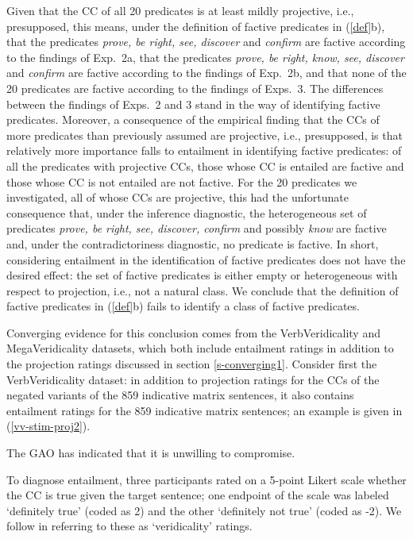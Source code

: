 \documentclass[11pt,fleqn]{article}
\newcommand{\6}{\mbox{$[\hspace*{-.6mm}[$}}
\newcommand{\9}{\mbox{$]\hspace*{-.6mm}]$}}
\begin{document}
{Given that the CC of all 20 predicates is at least mildly projective, i.e., presupposed, this means, under the definition of factive predicates in (\ref{def}b), that the predicates {\em prove, be right, see, discover} and {\em confirm} are factive according to the findings of Exp.~2a, that the predicates {\em prove, be right, know, see, discover} and {\em confirm} are factive according to the findings of Exp.~2b, and that none of the 20 predicates are factive according to the findings of Exps.~3. The differences between the findings of Exps.~2 and 3 stand in the way of identifying factive predicates. Moreover, a consequence of the empirical finding that the CCs of more predicates than previously assumed are projective, i.e., presupposed, is that relatively more importance falls to entailment in identifying factive predicates: of all the predicates with projective CCs, those whose CC is entailed are factive and those whose CC is not entailed are not factive. For the 20 predicates we investigated, all of whose CCs are projective, this had the unfortunate consequence that, under the inference diagnostic, the heterogeneous set of predicates {\em prove, be right, see, discover, confirm} and possibly {\em know} are factive and, under the contradictoriness diagnostic, no predicate is factive. In short, considering entailment in the identification of factive predicates does not have the desired effect: the set of factive predicates is either empty or heterogeneous with respect to projection, i.e., not a natural class. We conclude that the definition of factive predicates in (\ref{def}b) fails to identify a class of factive predicates. 

Converging evidence for this conclusion comes from the VerbVeridicality and MegaVeridicality datasets, which both include entailment ratings in addition to the projection ratings discussed in section \ref{s-converging1}. Consider first the VerbVeridicality dataset: in addition to projection ratings for the CCs of the negated variants of the 859 indicative matrix sentences, it also contains entailment ratings for the 859 indicative matrix sentences; an example is given in (\ref{vv-stim-proj2}). 

\begin{exe}
\ex\label{vv-stim-proj2} The GAO has indicated that it is unwilling to compromise.
\end{exe}
To diagnose entailment, three participants rated on a 5-point Likert scale whether the CC is true given the target sentence; one endpoint of the scale was labeled `definitely true' (coded as 2) and the other `definitely not true' (coded as -2). We follow \citet{ross-pavlick2019} in referring to these as `veridicality' ratings. 

}
\end{document}
